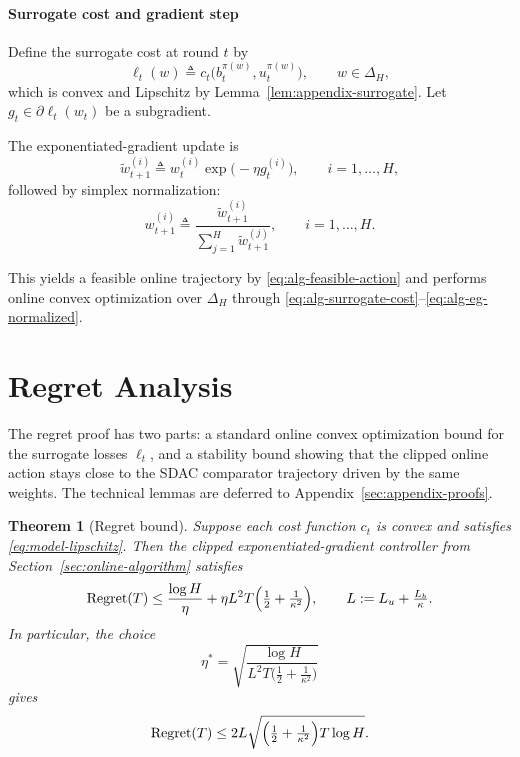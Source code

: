 \documentclass[11pt]{article}
\newtheorem{theorem}{Theorem}
\begin{document}
\paragraph{Surrogate cost and gradient step}
Define the surrogate cost at round $t$ by
\begin{equation}
\label{eq:alg-surrogate-cost}
\ell_t(w) \triangleq c_t\bigl(b_t^{\pi(w)},u_t^{\pi(w)}\bigr), \qquad w\in\Delta_H,
\end{equation}
which is convex and Lipschitz by Lemma~\ref{lem:appendix-surrogate}. Let $g_t\in\partial \ell_t(w_t)$ be a subgradient.

The exponentiated-gradient update is
\begin{equation}
\label{eq:alg-eg-unnormalized}
\widetilde{w}_{t+1}^{(i)} \triangleq w_t^{(i)}\exp\!\bigl(-\eta g_t^{(i)}\bigr), \qquad i=1,\ldots,H,
\end{equation}
followed by simplex normalization:
\begin{equation}
\label{eq:alg-eg-normalized}
w_{t+1}^{(i)} \triangleq \frac{\widetilde{w}_{t+1}^{(i)}}{\sum_{j=1}^H \widetilde{w}_{t+1}^{(j)}}, \qquad i=1,\ldots,H.
\end{equation}

This yields a feasible online trajectory by \eqref{eq:alg-feasible-action} and performs online convex optimization over $\Delta_H$ through \eqref{eq:alg-surrogate-cost}--\eqref{eq:alg-eg-normalized}.


\section{Regret Analysis}
\label{sec:regret-analysis}

The regret proof has two parts: a standard online convex optimization bound for the surrogate losses \(\ell_t\), and a stability bound showing that the clipped online action stays close to the SDAC comparator trajectory driven by the same weights. The technical lemmas are deferred to Appendix~\ref{sec:appendix-proofs}.

\begin{theorem}[Regret bound]
\label{thm:regret-bound}
Suppose each cost function \(c_t\) is convex and satisfies \eqref{eq:model-lipschitz}. Then the clipped exponentiated-gradient controller from Section~\ref{sec:online-algorithm} satisfies
\[
\mathrm{Regret}(T)
\le
\frac{\log H}{\eta}
+
\eta L^2 T\Bigl(\tfrac{1}{2}+\tfrac{1}{\kappa^2}\Bigr),
\qquad
L := L_u + \tfrac{L_b}{\kappa}.
\]
In particular, the choice
\[
\eta^*
=
\sqrt{\frac{\log H}{L^2 T\bigl(\tfrac{1}{2}+\tfrac{1}{\kappa^2}\bigr)}}
\]
gives
\[
\mathrm{Regret}(T)
\le
2L\sqrt{\Bigl(\tfrac{1}{2}+\tfrac{1}{\kappa^2}\Bigr)T\log H}.
\]
\end{theorem}
\end{document}
